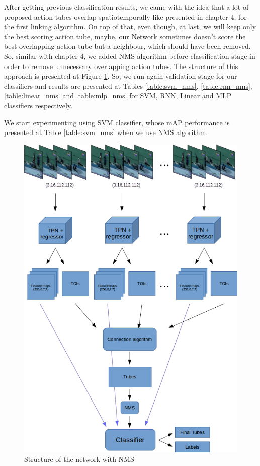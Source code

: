 \documentclass{report}
\begin{document}
After getting previous classification results, we came with the idea that a lot of proposed action tubes overlap spatiotemporally like presented in chapter 4,
for the first linking algorithm. On top of that, even though, at last, we will keep only the best scoring action tube, maybe, our Network sometimes
doesn't score the best overlapping action tube but a neighbour, which should have been removed. So, similar with chapter 4, we added NMS algorithm
before classification stage in order to remove unnecessary overlapping action tubes.
The structure of this approach is presented at Figure \ref{fig:network_nms}. So, we run again validation stage for our classifiers
and results are presented at Tables \ref{table:svm_nms}, \ref{table:rnn_nms}, \ref{table:linear_nms} and \ref{table:mlp_nms} for SVM, RNN, Linear
and MLP classifiers respectively. \par

We start experimenting using SVM classifier, whose mAP performance is presented at Table \ref{table:svm_nms} when we use NMS algorithm.

\begin{figure}[h]
  \centering
  \includegraphics[scale=0.4]{model_withnms}
  \caption{Structure of the network with NMS}
  \label{fig:network_nms}
\end{figure}
\end{document}
